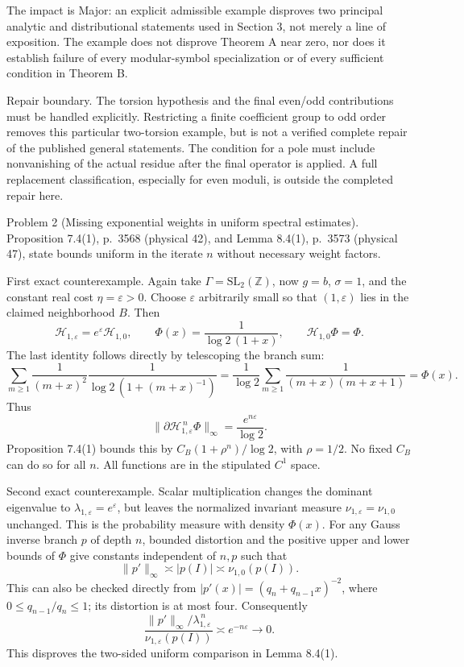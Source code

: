 \documentclass[10pt]{article}
\begin{document}
The impact is Major: an explicit admissible example disproves two principal analytic and distributional statements used in Section 3, not merely a line of exposition. The example does not disprove Theorem A near zero, nor does it establish failure of every modular-symbol specialization or of every sufficient condition in Theorem B.\par
Repair boundary. The torsion hypothesis and the final even/odd contributions must be handled explicitly. Restricting a finite coefficient group to odd order removes this particular two-torsion example, but is not a verified complete repair of the published general statements. The condition for a pole must include nonvanishing of the actual residue after the final operator is applied. A full replacement classification, especially for even moduli, is outside the completed repair here.\par
Problem 2 (Missing exponential weights in uniform spectral estimates).  Proposition 7.4(1), p. 3568 (physical 42), and Lemma 8.4(1), p. 3573 (physical 47), state bounds uniform in the iterate \(n\) without necessary weight factors.\par
First exact counterexample. Again take \(\Gamma=\mathrm{SL}_2(\mathbb Z)\), now \(g=b\), \(\sigma=1\), and the constant real cost \(\eta=\varepsilon>0\). Choose \(\varepsilon\) arbitrarily small so that \((1,\varepsilon)\) lies in the claimed neighborhood \(B\). Then \[\mathcal H_{1,\varepsilon}=e^\varepsilon\mathcal H_{1,0},\qquad
 \Phi(x)=\frac1{\log2\,(1+x)},\qquad
 \mathcal H_{1,0}\Phi=\Phi.\] The last identity follows directly by telescoping the branch sum: \[\sum_{m\ge1}\frac{1}{(m+x)^2}
       \frac1{\log2\,(1+(m+x)^{-1})}
 =\frac1{\log2}\sum_{m\ge1}
       \frac1{(m+x)(m+x+1)}=\Phi(x).\] Thus \[\|\partial\mathcal H_{1,\varepsilon}^{\,n}\Phi\|_\infty
 =\frac{e^{n\varepsilon}}{\log2}.\] Proposition 7.4(1) bounds this by \(C_B(1+\rho^n)/\log2\), with \(\rho=1/2\). No fixed \(C_B\) can do so for all \(n\). All functions are in the stipulated \(C^1\) space.\par
Second exact counterexample. Scalar multiplication changes the dominant eigenvalue to \(\lambda_{1,\varepsilon}=e^\varepsilon\), but leaves the normalized invariant measure \(\nu_{1,\varepsilon}=\nu_{1,0}\) unchanged. This is the probability measure with density \(\Phi(x)\). For any Gauss inverse branch \(p\) of depth \(n\), bounded distortion and the positive upper and lower bounds of \(\Phi\) give constants independent of \(n,p\) such that \[\|p'\|_\infty\asymp |p(I)|
       \asymp \nu_{1,0}(p(I)).\] This can also be checked directly from \(|p'(x)|=(q_n+q_{n-1}x)^{-2}\), where \(0\le q_{n-1}/q_n\le1\); its distortion is at most four. Consequently \[\frac{\|p'\|_\infty/\lambda_{1,\varepsilon}^{\,n}}
      {\nu_{1,\varepsilon}(p(I))}
 \asymp e^{-n\varepsilon}\longrightarrow0.
 \tag{2.2}\] This disproves the two-sided uniform comparison in Lemma 8.4(1).\par
\end{document}
